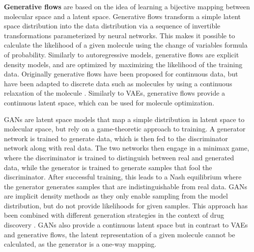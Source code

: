 \textbf{Generative flows} \citep{rezendeVariationalInferenceNormalizing2016} are based on the
idea of learning a bijective mapping between molecular space and a latent space. Generative flows
transform a simple latent space distribution into the data distribution via a sequence of invertible
transformations parameterized by neural networks. This makes it possible to calculate the likelihood
of a given molecule using the change of variables formula of probability. Similarly to
autoregressive models, generative flows are explicit density models, and are optimized by maximizing
the likelihood of the training data. Originally generative flows have been proposed for continuous
data, but have been adapted to discrete data such as molecules by using a continuous relaxation of
the molecule \citep{madhawaGraphNVPInvertibleFlow2019}. Similarly to \acp{VAE}, generative flows provide
a continuous latent space, which can be used for molecule optimization.

\Acp{GAN} \citep{goodfellowGenerativeAdversarialNetworks2014} are latent space models that map a
simple distribution in latent space to molecular space, but rely on a game-theoretic approach to
training. A generator network is trained to generate data, which is then fed to the discriminator
network along with real data. The two networks then engage in a minimax game, where the
discriminator is trained to distinguish between real and generated data, while the generator is
trained to generate samples that fool the discriminator. After successful training, this leads to a
Nash equilibrium where the generator generates samples that are indistinguishable from real data.
\Acp{GAN} are implicit density methods as they only enable sampling from the model distribution, but do
not provide likelihoods for given samples. This approach has been combined with different generation
strategies in the context of drug discovery
\citep{decaoMolGANImplicitGenerative2018,kadurinDruGANAdvancedGenerative2017,guimaraesObjectiveReinforcedGenerativeAdversarial2017,mendez-lucioNovoGenerationHitlike2018,tangMolecularGenerativeAdversarial2024}.
GANs also provide a continuous latent space but in contrast to VAEs and generative flows, the latent
representation of a given molecule cannot be calculated, as the generator is a one-way mapping.

